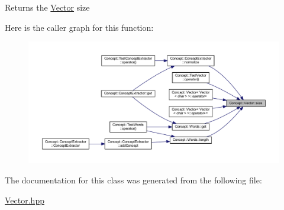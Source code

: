 \begin{DoxyReturn}{Returns}
the \mbox{\hyperlink{class_concept_1_1_vector}{Vector}} size 
\end{DoxyReturn}
Here is the caller graph for this function\+:\nopagebreak
\begin{figure}[H]
\begin{center}
\leavevmode
\includegraphics[width=350pt]{class_concept_1_1_vector_a8cffe973b29a8139f5b8c65409ad9f95_icgraph}
\end{center}
\end{figure}


The documentation for this class was generated from the following file\+:\begin{DoxyCompactItemize}
\item 
\mbox{\hyperlink{_vector_8hpp}{Vector.\+hpp}}\end{DoxyCompactItemize}
